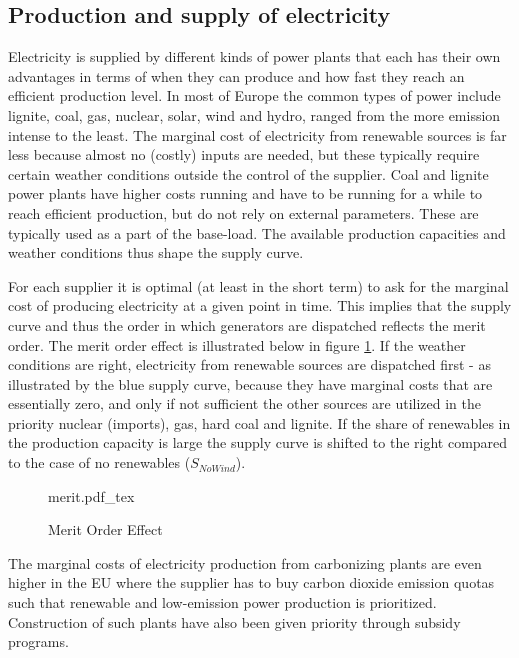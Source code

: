 \subsection{Production and supply of electricity}
\label{subsec:t_production}
Electricity is supplied by different kinds of power plants that each has their own advantages in terms of when they can produce and how fast they reach an efficient production level. In most of Europe the common types of power include lignite, coal, gas, nuclear, solar, wind and hydro, ranged from the more emission intense to the least. The marginal cost of electricity from renewable sources is far less because almost no (costly) inputs are needed, but these typically require certain weather conditions outside the control of the supplier. Coal and lignite power plants have higher costs running and have to be running for a while to reach efficient production, but do not rely on external parameters. These are typically used as a part of the base-load. The available production capacities and weather conditions thus shape the supply curve.
\bigskip \par
For each supplier it is optimal (at least in the short term) to ask for the marginal cost of producing electricity at a given point in time. This implies that the supply curve and thus the order in which generators are dispatched reflects the merit order. The merit order effect is illustrated below in figure \ref{fig:merit}. If the weather conditions are right, electricity from renewable sources are dispatched first - as illustrated by the blue supply curve, because they have marginal costs that are essentially zero, and only if not sufficient the other sources are utilized in the priority nuclear (imports), gas, hard coal and lignite. If the share of renewables in the production capacity is large the supply curve is shifted to the right compared to the case of no renewables ($S_{NoWind}$).
\begin{figure}[H]
    \centering
    \caption{Merit Order Effect}
    \label{fig:merit}
    \center
        \def\svgwidth{0.9\textwidth}
        {merit.pdf_tex}
\end{figure}
The marginal costs of electricity production from carbonizing plants are even higher in the EU where the supplier has to buy carbon dioxide emission quotas such that renewable and low-emission power production is prioritized. Construction of such plants have also been given priority through subsidy programs.  \bigskip \par
